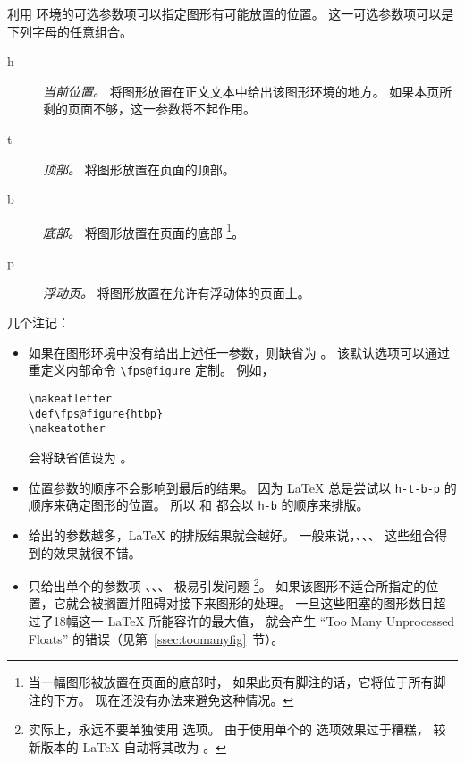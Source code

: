 利用  环境的可选参数项可以指定图形有可能放置的位置。
这一可选参数项可以是下列字母的任意组合。
\begin{description}
	\item [h] \emph{当前位置。} 
	将图形放置在正文文本中给出该图形环境的地方。
	如果本页所剩的页面不够，这一参数将不起作用。
	\item [t] \emph{顶部。} 将图形放置在页面的顶部。
	\item [b] \emph{底部。} 将图形放置在页面的底部
	\footnote{当一幅图形被放置在页面的底部时，
		如果此页有脚注的话，它将位于所有脚注的下方。
		现在还没有办法来避免这种情况。}。
	\item [p] \emph{浮动页。} 将图形放置在允许有浮动体的页面上。
\end{description}

几个注记：
\begin{itemize}
	\item 如果在图形环境中没有给出上述任一参数，则缺省为 \opt{[tbp]}。
	该默认选项可以通过重定义内部命令 \verb|\fps@figure| 定制。
	例如，
\begin{lstlisting}
\makeatletter
\def\fps@figure{htbp}
\makeatother
\end{lstlisting}
	会将缺省值设为 \opt{[htbp]}。
	
	\item 位置参数的顺序不会影响到最后的结果。
	因为 \LaTeX{} 总是尝试以 \texttt{h-t-b-p} 的顺序来确定图形的位置。
	所以 \opt{[hb]} 和 \opt{[bh]} 都会以 \texttt{h-b}	的顺序来排版。
	
	\item 给出的参数越多，\LaTeX{} 的排版结果就会越好。
	一般来说，\opt{[htbp]}、\opt{[tbp]}、\opt{[htp]}、\opt{[tp]} 这些组合得到的效果就很不错。
	
	\item 只给出单个的参数项 \opt{[t]}、\opt{[b]}、\opt{[p]}、\opt{[h]} 极易引发问题
	\footnote{实际上，永远不要单独使用 \opt{[h]} 选项。
		由于使用单个的 \opt{[h]} 选项效果过于糟糕，
		较新版本的 \LaTeX{} 自动将其改为 \opt{[ht]}。}。
	如果该图形不适合所指定的位置，它就会被搁置并阻碍对接下来图形的处理。
	一旦这些阻塞的图形数目超过了18幅这一 \LaTeX{} 所能容许的最大值，
	就会产生 ``Too Many Unprocessed Floats'' 的错误（见第~\ref{ssec:toomanyfig}~节）。
\end{itemize}

